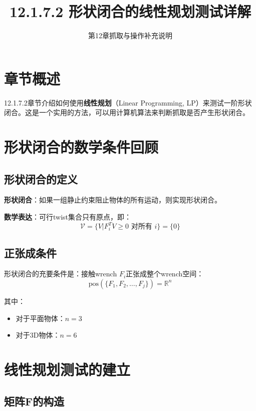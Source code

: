 \documentclass[12pt,a4paper]{article}
\title{12.1.7.2 形状闭合的线性规划测试详解}
\author{第12章抓取与操作补充说明}
\date{}
\begin{document}
\maketitle

\section{章节概述}

12.1.7.2章节介绍如何使用\textbf{线性规划}（Linear Programming, LP）来测试一阶形状闭合。这是一个实用的方法，可以用计算机算法来判断抓取是否产生形状闭合。

\section{形状闭合的数学条件回顾}

\subsection{形状闭合的定义}

\textbf{形状闭合}：如果一组静止约束阻止物体的所有运动，则实现形状闭合。

\textbf{数学表达}：可行twist集合只有原点，即：
\begin{equation}
\mathcal{V} = \{V | F_i^T V \geq 0 \text{ 对所有 } i\} = \{0\}
\end{equation}

\subsection{正张成条件}

形状闭合的充要条件是：接触wrench $F_i$正张成整个wrench空间：
\begin{equation}
\text{pos}(\{F_1, F_2, \ldots, F_j\}) = \mathbb{R}^n
\end{equation}

其中：
\begin{itemize}
\item 对于平面物体：$n = 3$
\item 对于3D物体：$n = 6$
\end{itemize}

\section{线性规划测试的建立}

\subsection{矩阵F的构造}
\end{document}
